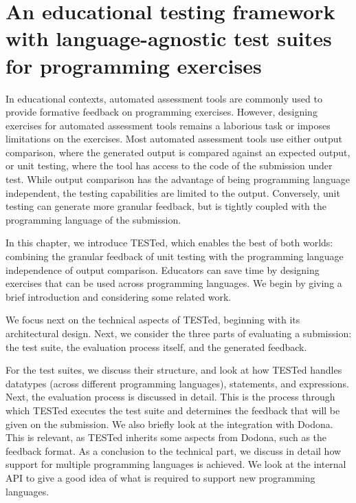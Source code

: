 \documentclass[../main]{subfiles}
\begin{document}
\chapter[An educational testing framework]{An educational testing framework with language-agnostic test suites for programming exercises}\label{ch:tested1}


In educational contexts, automated assessment tools are commonly used to provide formative feedback on programming exercises.
However, designing exercises for automated assessment tools remains a laborious task or imposes limitations on the exercises.
Most automated assessment tools use either output comparison, where the generated output is compared against an expected output, or unit testing, where the tool has access to the code of the submission under test.
While output comparison has the advantage of being programming language independent, the testing capabilities are limited to the output.
Conversely, unit testing can generate more granular feedback, but is tightly coupled with the programming language of the submission.

In this chapter, we introduce TESTed, which enables the best of both worlds: combining the granular feedback of unit testing with the programming language independence of output comparison.
Educators can save time by designing exercises that can be used across programming languages.
We begin by giving a brief introduction and considering some related work.

We focus next on the technical aspects of TESTed, beginning with its architectural design.
Next, we consider the three parts of evaluating a submission:
the test suite, the evaluation process itself, and the generated feedback.

For the test suites, we discuss their structure, and look at how TESTed handles datatypes (across different programming languages), statements, and expressions.
Next, the evaluation process is discussed in detail.
This is the process through which TESTed executes the test suite and determines the feedback that will be given on the submission.
We also briefly look at the integration with Dodona.
This is relevant, as TESTed inherits some aspects from Dodona, such as the feedback format.
As a conclusion to the technical part, we discuss in detail how support for multiple programming languages is achieved.
We look at the internal API to give a good idea of what is required to support new programming languages.
\end{document}
